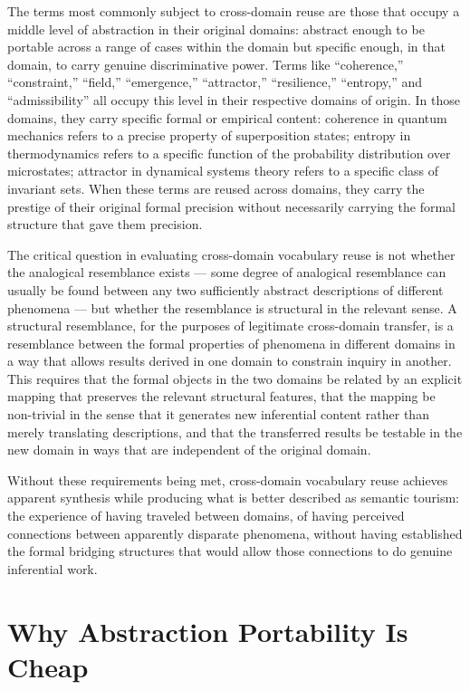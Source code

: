\documentclass[12pt, openright, twoside]{book}
\begin{document}
The terms most commonly subject to cross-domain reuse
are those that occupy a middle level of abstraction
in their original domains: abstract enough to be
portable across a range of cases within the domain
but specific enough, in that domain, to carry genuine
discriminative power. Terms like ``coherence,''
``constraint,'' ``field,'' ``emergence,'' ``attractor,''
``resilience,'' ``entropy,'' and ``admissibility'' all
occupy this level in their respective domains of
origin. In those domains, they carry specific formal
or empirical content: coherence in quantum mechanics
refers to a precise property of superposition states;
entropy in thermodynamics refers to a specific function
of the probability distribution over microstates;
attractor in dynamical systems theory refers to a
specific class of invariant sets. When these terms
are reused across domains, they carry the prestige
of their original formal precision without necessarily
carrying the formal structure that gave them precision.

The critical question in evaluating cross-domain
vocabulary reuse is not whether the analogical
resemblance exists --- some degree of analogical
resemblance can usually be found between any two
sufficiently abstract descriptions of different
phenomena --- but whether the resemblance is
structural in the relevant sense. A structural
resemblance, for the purposes of legitimate
cross-domain transfer, is a resemblance between
the formal properties of phenomena in different
domains in a way that allows results derived in
one domain to constrain inquiry in another. This
requires that the formal objects in the two domains
be related by an explicit mapping that preserves
the relevant structural features, that the mapping
be non-trivial in the sense that it generates
new inferential content rather than merely
translating descriptions, and that the transferred
results be testable in the new domain in ways
that are independent of the original domain.

Without these requirements being met, cross-domain
vocabulary reuse achieves apparent synthesis while
producing what is better described as semantic
tourism: the experience of having traveled between
domains, of having perceived connections between
apparently disparate phenomena, without having
established the formal bridging structures that
would allow those connections to do genuine
inferential work.

\section{Why Abstraction Portability Is Cheap}
\end{document}

